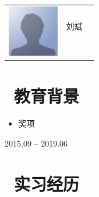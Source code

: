 \documentclass{resume}
\begin{document}

{
\Large{
 \begin{onehalfspacing}
 \begin{tabu}{c l l}
   \hspace{1em}
 	& \\
 	\vspace{1ex}
    & \huge{\scshape{刘斌}}\\
    &  
    &  \\
    &  &
    \hspace{2em} {\textit{}} \\
    & \\
  \end{tabu}
   \end{onehalfspacing}
	}
} 
\vspace{-4ex}
\section{\faGraduationCap\  教育背景}
\begin{onehalfspacing}
\begin{itemize}
  \item 奖项
\end{itemize}
\end{onehalfspacing}
 {2015.09 -- 2019.06}
\begin{onehalfspacing}
\end{onehalfspacing}

\section{\faUsers\ 实习经历}
\
\vspace{-2ex}
\begin{onehalfspacing}
\end{onehalfspacing}
\end{document}
